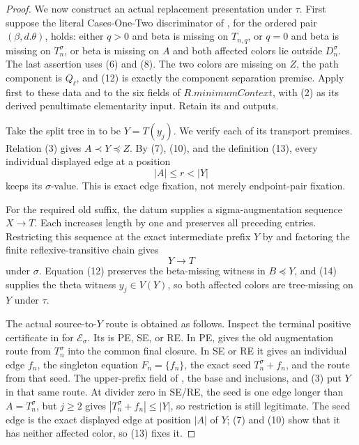 \begin{proof}
{We now construct an actual replacement presentation under $\tau$.
First suppose the literal Cases-One-Two discriminator of
, for the ordered pair
$(\beta,d.\theta)$, holds: either $q>0$ and beta is missing on
$T_{n,q}$, or $q=0$ and beta is missing on $T_n^\sigma$, or beta is
missing on $A$ and both affected colors lie outside $D_n^\sigma$.
The last assertion uses (6) and (8).  The two colors are missing on $Z$,
the path component is $Q_\ell$, and (12) is exactly the component
separation premise.  Apply  first to
these data and to the six fields of $R.\mathit{minimumContext}$, with
(2) as its derived penultimate elementarity input.  Retain its
 and  outputs.

Take the split tree in
 to be $Y=T(y_j)$.  We verify
each of its transport premises.  Relation (3) gives $A\prec Y\preccurlyeq Z$.  By (7), (10), and the definition (13), every individual displayed
edge at a position
\[
                         |A|\le r<|Y|                          \tag{15}
\]
keeps its $\sigma$-value.  This is exact edge fixation, not merely
endpoint-pair fixation.

For the required old suffix, the datum supplies a sigma-augmentation
sequence $X\to T$.  Each  increases
length by one and preserves all preceding entries.  Restricting this
sequence at the exact intermediate prefix $Y$ by
 and factoring the finite
reflexive-transitive chain gives
\[
                           Y\longrightarrow T                 \tag{16}
\]
under $\sigma$.  Equation (12) preserves the beta-missing witness in
$B\preccurlyeq Y$, and (14) supplies the theta witness $y_j\in V(Y)$,
so both affected colors are tree-missing on $Y$ under $\tau$.

The actual source-to-$Y$ route is obtained as follows.  Inspect the
terminal positive certificate in
 for $\mathcal E_\sigma$.  Its
 is PE, SE, or RE.  In PE,
 gives the old augmentation route from
$T_n^\sigma$ into the common final closure.  In SE or RE it gives an
individual edge $f_n$, the singleton equation $F_n=\{f_n\}$, the
exact  seed $T_n^\sigma+f_n$, and the
route from that seed.  The upper-prefix field of
, the base and
 inclusions, and
(3) put $Y$ in that same route.  At divider zero in SE/RE, the seed is
one edge longer than $A=T_n^\sigma$, but $j\ge2$ gives
$|T_n^\sigma+f_n|\le|Y|$, so restriction is still legitimate.  The seed edge is the exact displayed edge at position $|A|$ of $Y$;
(7) and (10) show that it has neither affected color, so (13) fixes it.

}
\end{proof}
